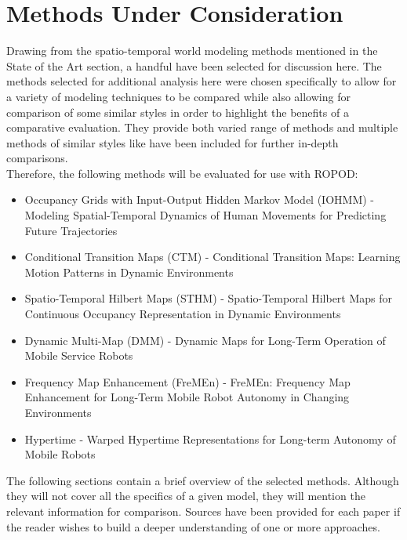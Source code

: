   \section{ Methods Under Consideration }

  Drawing from the spatio-temporal world modeling methods mentioned in the
  State of the Art section, a handful have been selected for discussion here.
  The methods selected for additional analysis here were chosen specifically
  to allow for a variety of modeling techniques to be compared while also
  allowing for comparison of some similar styles in order to highlight the
  benefits of a comparative evaluation. They provide both varied range of
  methods and multiple methods of similar styles like have been included for
  further in-depth comparisons. \\

  Therefore, the following methods will be evaluated for use with ROPOD:

  \begin{itemize}
    \item Occupancy Grids with Input-Output Hidden Markov Model (IOHMM) - Modeling Spatial-Temporal Dynamics of Human Movements for Predicting Future Trajectories \cite{Wang2015}
    \item Conditional Transition Maps (CTM) - Conditional Transition Maps: Learning Motion Patterns in Dynamic Environments \cite{Kucner2013}
    \item Spatio-Temporal Hilbert Maps (STHM) - Spatio-Temporal Hilbert Maps for Continuous Occupancy Representation in Dynamic Environments \cite{Senanayake2016}
    \item Dynamic Multi-Map (DMM) - Dynamic Maps for Long-Term Operation of Mobile Service Robots \cite{Biber2005}
    \item Frequency Map Enhancement (FreMEn) - FreMEn: Frequency Map Enhancement for Long-Term Mobile Robot Autonomy in Changing Environments \cite{Krajnik2015}
    \item Hypertime - Warped Hypertime Representations for Long-term Autonomy of Mobile Robots \cite{Krajnik2018}
  \end{itemize}

  The following sections contain a brief overview of the selected methods.
  Although they will not cover all the specifics of a given model, they will
  mention the relevant information for comparison. Sources have been provided
  for each paper if the reader wishes to build a deeper understanding of one
  or more approaches. \\

